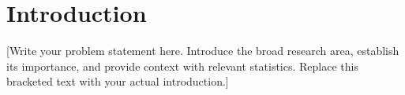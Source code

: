 
\section{Introduction}



[Write your problem statement here. Introduce the broad research area, establish its
importance, and provide context with relevant statistics. Replace this bracketed text
with your actual introduction.]


